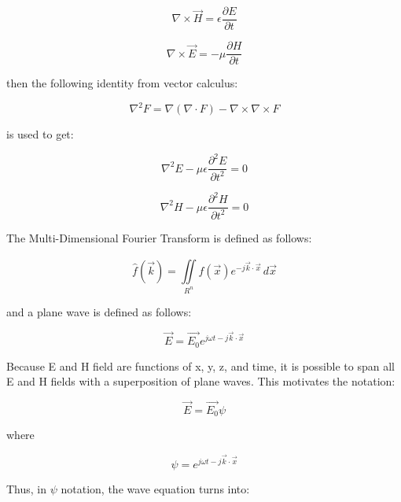 \documentclass[12pt]{article}
\begin{document}
\begin{equation}
	\nabla \times \vec{H} = \epsilon\frac{\partial E}{\partial t}
\end{equation}

\begin{equation}
	\nabla \times \vec{E} = -\mu\frac{\partial H}{\partial t}
\end{equation}

then the following identity from vector calculus:

\begin{equation}
	\nabla^2F = \nabla(\nabla \cdot F) - \nabla\times\nabla\times F
\end{equation}

is used to get:

\begin{equation}
	\nabla^2E - \mu\epsilon\frac{\partial^2 E}{\partial t^2} = 0
\end{equation}

\begin{equation}
	\nabla^2H - \mu\epsilon\frac{\partial^2 H}{\partial t^2} = 0
\end{equation}

The Multi-Dimensional Fourier Transform is defined as follows:

\begin{equation}
	\hat{f} (\vec{k}) = \iint \limits_{R^n}^{} f(\vec{x})e^{-j \vec{k} \cdot \vec{x}} \,d\vec{x}
\end{equation}

and a plane wave is defined as follows:

\begin{equation}
	\vec{E} = \vec{E_{0}}e^{j \omega t - j\vec{k} \cdot \vec{x}}
\end{equation}

Because E and H field are functions of x, y, z, and time, it is possible to span all E and H fields with a superposition of plane waves. This motivates the notation:

\begin{equation}
	\vec{E} = \vec{E_{0}}\psi
\end{equation}

where

\begin{equation}
	\psi = e^{j \omega t - j\vec{k} \cdot \vec{x}}
\end{equation}

Thus, in \(\psi\) notation, the wave equation turns into:
\end{document}
